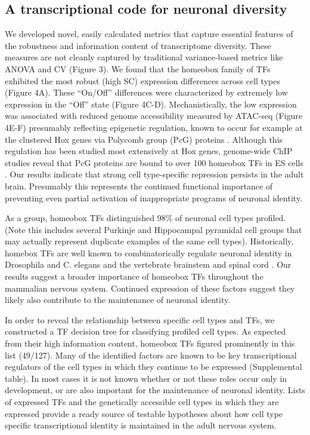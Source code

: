 \subsection{A transcriptional code for neuronal diversity}
We developed novel, easily calculated metrics that capture essential features of the robustness and information content of transcriptome diversity. These measures are not cleanly captured by traditional variance-based metrics like ANOVA and CV (Figure 3). We found that the homeobox family of TFs exhibited the most robust (high SC) expression differences across cell types (Figure 4A). These “On/Off” differences were characterized by extremely low expression in the “Off” state (Figure 4C-D). Mechanistically, the low expression was associated with reduced genome accessibility measured by ATAC-seq (Figure 4E-F) presumably reflecting epigenetic regulation, known to occur for example at the clustered Hox genes via Polycomb group (PcG) proteins \cite{Montavon_2014}. Although this regulation has been studied most extensively at Hox genes, genome-wide ChIP studies reveal that PcG proteins are bound to over 100 homeobox TFs in ES cells \cite{Boyer_2006}. Our results indicate that strong cell type-specific repression persists in the adult brain. Presumably this represents the continued functional importance of preventing even partial activation of inappropriate programs of neuronal identity. 

As a group, homeobox TFs distinguished 98\% of neuronal cell types profiled. (Note this includes several Purkinje and Hippocampal pyramidal cell groups that may actually represent duplicate examples of the same cell types). Historically, homebox TFs are well known to combinatorically regulate neuronal identity in Drosophila and C. elegans \cite{Kratsios_2017} and the vertebrate brainstem and spinal cord \cite{Dasen_2009,Philippidou_2013}. Our results suggest a broader importance of homeobox TFs throughout the mammalian nervous system. Continued expression of these factors suggest they likely also contribute to the maintenance of neuronal identity.

In order to reveal the relationship between specific cell types and TFs, we constructed a TF decision tree for classifying profiled cell types. As expected from their high information content, homeobox TFs figured prominently in this list (49/127). Many of the identified factors are known to be key transcriptional regulators of the cell types in which they continue to be expressed (Supplemental table). In most cases it is not known whether or not these roles occur only in development, or are also important for the maintenance of neuronal identity. Lists of expressed TFs and the genetically accessible cell types in which they are expressed provide a ready source of testable hypotheses about how cell type specific transcriptional identity is maintained in the adult nervous system.

